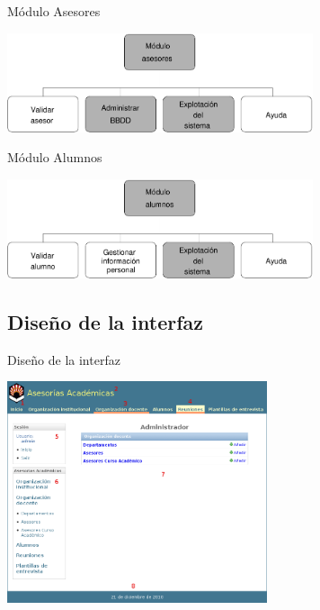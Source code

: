 \documentclass[10pt, hyperref={pdfpagelabels=false}]{beamer}
\begin{document}
      \begin{frame}{Módulo Asesores}
        \begin{center}
          \includegraphics[width=9cm]{Diagramas/moduloAsesores}
        \end{center}
      \end{frame}

      \begin{frame}{Módulo Alumnos}
        \begin{center}
          \includegraphics[width=9cm]{Diagramas/moduloAlumnos}
        \end{center}
      \end{frame}

    \subsection{Diseño de la interfaz}
      \begin{frame}{Diseño de la interfaz}
        \begin{center}
          \includegraphics[height=6.5cm]{Diagramas/gestion_informacion.png}
        \end{center}
      \end{frame}
\end{document}
